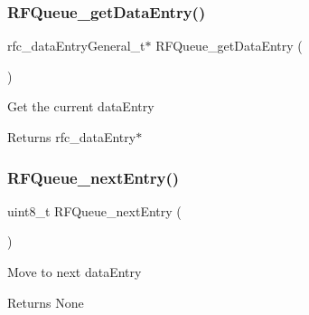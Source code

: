 \subsubsection{\texorpdfstring{R\+F\+Queue\+\_\+get\+Data\+Entry()}{RFQueue\_getDataEntry()}}
{\footnotesize\ttfamily rfc\+\_\+data\+Entry\+General\+\_\+t$\ast$ R\+F\+Queue\+\_\+get\+Data\+Entry (\begin{DoxyParamCaption}{ }\end{DoxyParamCaption})}

Get the current data\+Entry

\begin{DoxyReturn}{Returns}
rfc\+\_\+data\+Entry$\ast$ 
\end{DoxyReturn}
\mbox{\label{group__rfqueue__api_gad4ae4cf528d203b97d3b7deab662d533}} 
\subsubsection{\texorpdfstring{R\+F\+Queue\+\_\+next\+Entry()}{RFQueue\_nextEntry()}}
{\footnotesize\ttfamily uint8\+\_\+t R\+F\+Queue\+\_\+next\+Entry (\begin{DoxyParamCaption}{ }\end{DoxyParamCaption})}

Move to next data\+Entry

\begin{DoxyReturn}{Returns}
None 
\end{DoxyReturn}

